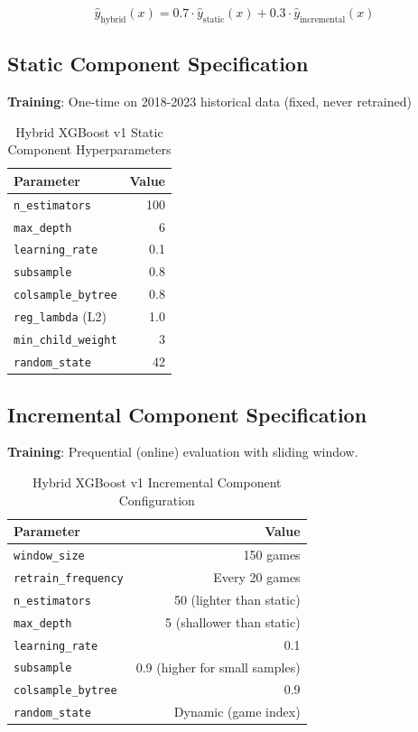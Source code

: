 \begin{equation}
\hat{y}_{\text{hybrid}}(x) = 0.7 \cdot \hat{y}_{\text{static}}(x) + 0.3 \cdot \hat{y}_{\text{incremental}}(x)
\label{eq:hybrid-architecture}
\end{equation}

\subsection{Static Component Specification}

\textbf{Training}: One-time on 2018-2023 historical data (fixed, never retrained)

\begin{table}[htbp]
\centering
\caption{Hybrid XGBoost v1 Static Component Hyperparameters}
\label{tab:hybrid-static-hyperparameters}
\begin{tabular}{lr}
\toprule
\textbf{Parameter} & \textbf{Value} \\
\midrule
\texttt{n\_estimators} & 100 \\
\texttt{max\_depth} & 6 \\
\texttt{learning\_rate} & 0.1 \\
\texttt{subsample} & 0.8 \\
\texttt{colsample\_bytree} & 0.8 \\
\texttt{reg\_lambda} (L2) & 1.0 \\
\texttt{min\_child\_weight} & 3 \\
\texttt{random\_state} & 42 \\
\bottomrule
\end{tabular}
\end{table}

\subsection{Incremental Component Specification}

\textbf{Training}: Prequential (online) evaluation with sliding window.

\begin{table}[htbp]
\centering
\caption{Hybrid XGBoost v1 Incremental Component Configuration}
\label{tab:hybrid-incremental-config}
\begin{tabular}{lr}
\toprule
\textbf{Parameter} & \textbf{Value} \\
\midrule
\texttt{window\_size} & 150 games \\
\texttt{retrain\_frequency} & Every 20 games \\
\texttt{n\_estimators} & 50 (lighter than static) \\
\texttt{max\_depth} & 5 (shallower than static) \\
\texttt{learning\_rate} & 0.1 \\
\texttt{subsample} & 0.9 (higher for small samples) \\
\texttt{colsample\_bytree} & 0.9 \\
\texttt{random\_state} & Dynamic (game index) \\
\bottomrule
\end{tabular}
\end{table}

